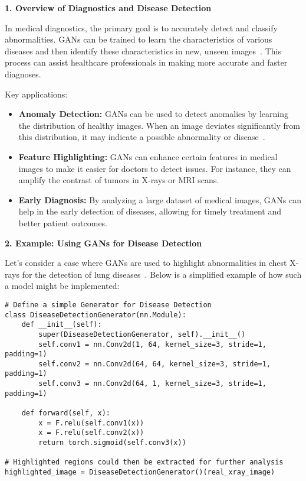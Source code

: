 \textbf{1. Overview of Diagnostics and Disease Detection}

In medical diagnostics, the primary goal is to accurately detect and classify abnormalities. GANs can be trained to learn the characteristics of various diseases and then identify these characteristics in new, unseen images~\cite{razzak2018deep}. This process can assist healthcare professionals in making more accurate and faster diagnoses. 

Key applications:
\begin{itemize}
    \item \textbf{Anomaly Detection:} GANs can be used to detect anomalies by learning the distribution of healthy images. When an image deviates significantly from this distribution, it may indicate a possible abnormality or disease~\cite{xia2022gan}.
    \item \textbf{Feature Highlighting:} GANs can enhance certain features in medical images to make it easier for doctors to detect issues. For instance, they can amplify the contrast of tumors in X-rays or MRI scans.
    \item \textbf{Early Diagnosis:} By analyzing a large dataset of medical images, GANs can help in the early detection of diseases, allowing for timely treatment and better patient outcomes.
\end{itemize}

\textbf{2. Example: Using GANs for Disease Detection}

Let's consider a case where GANs are used to highlight abnormalities in chest X-rays for the detection of lung diseases~\cite{xia2022gan}. Below is a simplified example of how such a model might be implemented:

\begin{lstlisting}[style=python]
# Define a simple Generator for Disease Detection
class DiseaseDetectionGenerator(nn.Module):
    def __init__(self):
        super(DiseaseDetectionGenerator, self).__init__()
        self.conv1 = nn.Conv2d(1, 64, kernel_size=3, stride=1, padding=1)
        self.conv2 = nn.Conv2d(64, 64, kernel_size=3, stride=1, padding=1)
        self.conv3 = nn.Conv2d(64, 1, kernel_size=3, stride=1, padding=1)
    
    def forward(self, x):
        x = F.relu(self.conv1(x))
        x = F.relu(self.conv2(x))
        return torch.sigmoid(self.conv3(x))

# Highlighted regions could then be extracted for further analysis
highlighted_image = DiseaseDetectionGenerator()(real_xray_image)
\end{lstlisting}

